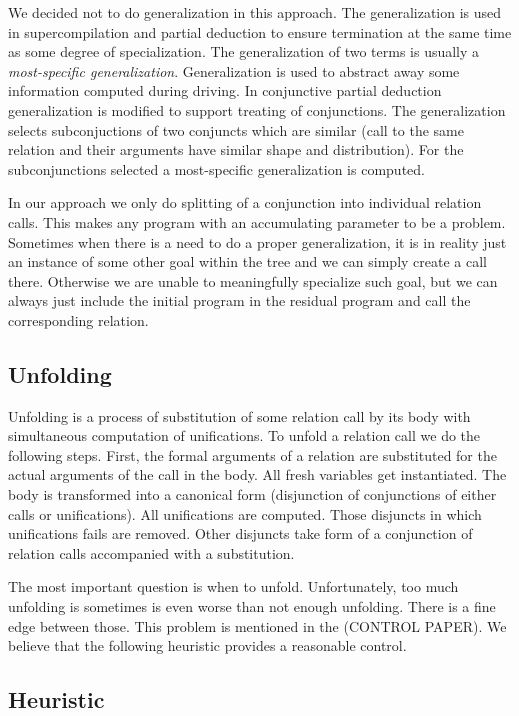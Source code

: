 We decided not to do generalization in this approach.
The generalization is used in supercompilation and partial deduction to ensure termination at the same time as some degree of specialization.
The generalization of two terms is usually a \emph{most-specific generalization}.
Generalization is used to abstract away some information computed during driving.
In conjunctive partial deduction generalization is modified to support treating of conjunctions.
The generalization selects subconjuctions of two conjuncts which are similar (call to the same relation and their arguments have similar shape and distribution).
For the subconjunctions selected a most-specific generalization is computed.

In our approach we only do splitting of a conjunction into individual relation calls.
This makes any program with an accumulating parameter to be a problem.
Sometimes when there is a need to do a proper generalization, it is in reality just an instance of some other goal within the tree and we can simply create a call there.
Otherwise we are unable to meaningfully specialize such goal, but we can always just include the initial program in the residual program and call the corresponding relation.


\subsection{Unfolding}

Unfolding is a process of substitution of some relation call by its body with simultaneous computation of unifications.
To unfold a relation call we do the following steps.
First, the formal arguments of a relation are substituted for the actual arguments of the call in the body.
All fresh variables get instantiated.
The body is transformed into a canonical form (disjunction of conjunctions of either calls or unifications).
All unifications are computed.
Those disjuncts in which unifications fails are removed.
Other disjuncts take form of a conjunction of relation calls accompanied with a substitution.

The most important question is when to unfold.
Unfortunately, too much unfolding is sometimes is even worse than not enough unfolding.
There is a fine edge between those.
This problem is mentioned in the (CONTROL PAPER).
We believe that the following heuristic provides a reasonable control.

\subsection{Heuristic}


